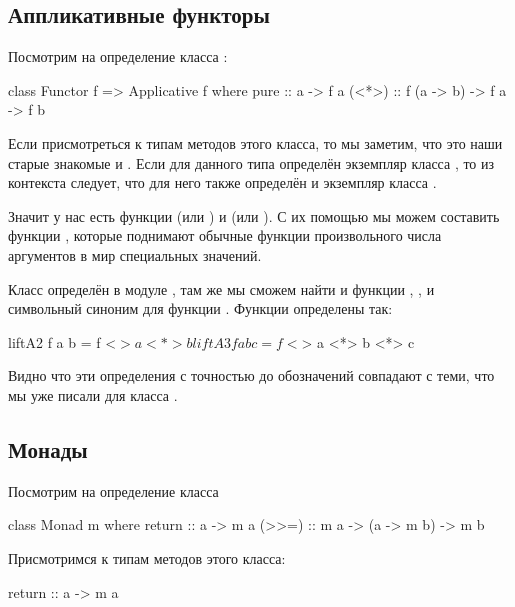 \subsection{Аппликативные функторы}

Посмотрим на определение класса
 :


\begin{code}
class Functor f => Applicative f where
        pure    :: a -> f a
        (<*>)   :: f (a -> b) -> f a -> f b
\end{code}

Если присмотреться к типам методов этого класса, то мы заметим, что это
наши старые знакомые  и \In{$$}. Если для данного типа 
определён экземпляр класса , то из контекста следует,
что для него также определён и экземпляр класса .

Значит у нас есть функции  (или ) и \In{<*>} (или
\In{$$}). С их помощью мы можем составить функции , которые
поднимают обычные функции произвольного числа аргументов в мир
специальных значений.

Класс  определён в модуле , там
же мы сможем найти и функции , ,  и
символьный синоним \In{<$>} для функции . Функции 
определены так:


\begin{code}
liftA2 f a b   = f <$> a <*> b
liftA3 f a b c = f <$> a <*> b <*> c
\end{code}

Видно что эти определения с точностью до обозначений совпадают с теми,
что мы уже писали для класса .

\subsection{Монады}

Посмотрим на определение класса  


\begin{code}
class Monad m where
  return :: a -> m a
  (>>=)  :: m a -> (a -> m b) -> m b
\end{code}

Присмотримся к типам методов этого класса:


\begin{code}
return :: a -> m a
\end{code}

